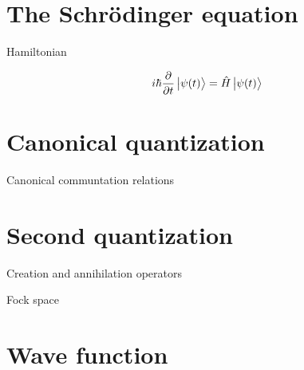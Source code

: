 \section{The Schrödinger equation}

Hamiltonian 

\begin{equation}
i \hbar \frac{\partial}{\partial t} \ket{\psi(t)} = \hat{H} \ket{\psi(t)}
\end{equation}

\section{Canonical quantization}

Canonical communtation relations 

\section{Second quantization}

Creation and annihilation operators

Fock space

\section{Wave function}